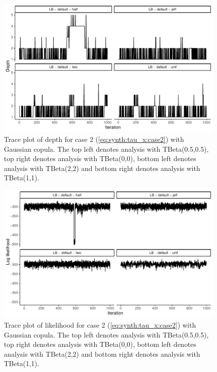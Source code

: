 \documentclass{amsart}
\begin{document}
\begin{figure}
	\centering
	\includegraphics[width = 0.75\linewidth]{trace_case2_gauss_depth.pdf}
	\caption{Trace plot of depth for case 2 (\cref{eq:synth:tau_x:case2}) with Gaussian copula. The top left denotes analysis with TBeta(0.5,0.5), top right denotes analysis with TBeta(0,0), bottom left denotes analysis with TBeta(2,2) and bottom right denotes analysis with TBeta(1,1).}
	\label{fig:case2:gauss:depth}
\end{figure}

\begin{figure}
	\centering
	\includegraphics[width = 0.75\linewidth]{trace_case2_gauss_like.pdf}
	\caption{Trace plot of likelihood for case 2 (\cref{eq:synth:tau_x:case2}) with Gaussian copula. The top left denotes analysis with TBeta(0.5,0.5), top right denotes analysis with TBeta(0,0), bottom left denotes analysis with TBeta(2,2) and bottom right denotes analysis with TBeta(1,1).}
	\label{fig:case2:gauss:like}
\end{figure}
\end{document}
